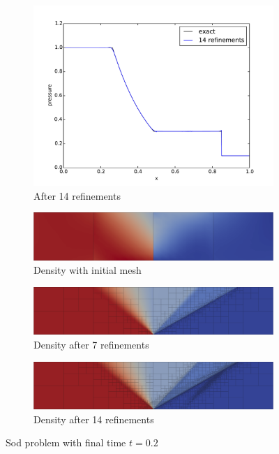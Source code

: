 \documentclass[preprint,12pt]{elsarticle}
\begin{document}
\begin{figure}[p]
\begin{subfigure}[c]{0.3\textwidth}
\includegraphics[width=\textwidth]{SpaceTimeCNS/Sod1e-5/pres15.pdf}
\caption{After 14 refinements}
\label{fig:sod_pres14}
\end{subfigure}
\begin{subfigure}[c]{0.45\textwidth}
\centering
\includegraphics[width=\textwidth]{SpaceTimeCNS/Sod1e-5/mesh1.png}
\caption{Density with initial mesh}
\label{fig:sod_mesh0}
\end{subfigure}
\begin{subfigure}[c]{0.45\textwidth}
\centering
\includegraphics[width=\textwidth]{SpaceTimeCNS/Sod1e-5/mesh8.png}
\caption{Density after 7 refinements}
\label{fig:sod_mesh7}
\end{subfigure}
\begin{subfigure}[c]{0.9\textwidth}
\centering
\includegraphics[width=\textwidth]{SpaceTimeCNS/Sod1e-5/mesh15.png}
\caption{Density after 14 refinements}
\label{fig:sod_mesh14}
\end{subfigure}
\caption{Sod problem with final time $t=0.2$}
\label{fig:sod}
\end{figure}
\end{document}
